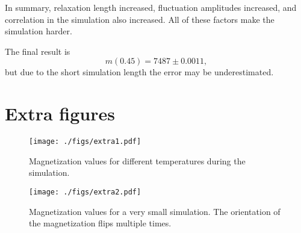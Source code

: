 \documentclass[pdftex,12pt,a4paper]{article}
\begin{document}
		In summary, relaxation length increased, fluctuation amplitudes increased, and correlation in the simulation also increased. All of these factors make the simulation harder.
		
		The final result is
		\begin{equation}
		m(0.45) = 7487 \pm 0.0011,
		\end{equation}
		but due to the short simulation length the error may be underestimated.
	\section{Extra figures}
		\begin{figure}[H]
			\centering
			\texttt{[image: ./figs/extra1.pdf]}
			\caption{Magnetization values for different temperatures during the simulation.}
			\label{extra1}
		\end{figure}
		\begin{figure}[H]
			\centering
			\texttt{[image: ./figs/extra2.pdf]}
			\caption{Magnetization values for a very small simulation. The orientation of the magnetization flips multiple times.}
			\label{extra1}
		\end{figure}
	
\end{document}
